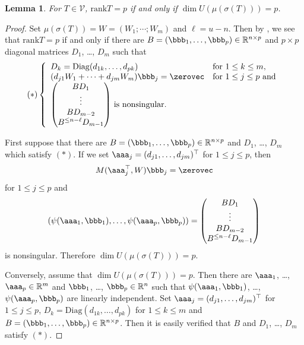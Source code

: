 \documentclass[a4paper,12pt]{article}
\newcommand{\RRR}{\mathbb{R}}
\newcommand{\msVVV}{\mathscr{V}}
\newcommand{\rank}{\mathrm{rank}}
\newcommand{\transpose}{^\top}
\newcommand\diag{\mathrm{Diag}}
\newcommand\nonsing{nonsingular}
\newtheorem{lemma}[thm]{Lemma}
\begin{document}
\begin{lemma}
\label{lem:rank p}
For $T\in\msVVV$, 
$\rank T=p$ if and only if $\dim U(\mu(\sigma(T)))=p$.
\end{lemma}
%
%
\begin{proof}
Set $\mu(\sigma(T))=W=(W_1;\cdots;W_m)$
and $\ell=u-n$.
Then by \cite[Theorem 6.5 (1)$\iff$(3)]{sms17},
we see that $\rank T=p$ if and only if there are
$B=(\bbb_1, \ldots, \bbb_p)\in\RRR^{n\times p}$
and $p\times p$ diagonal matrices $D_1$, \ldots, $D_m$
such that
$$
(\ast)
\left\{
\begin{array}{lll}
D_k=\diag(d_{1k},\ldots, d_{pk})&\mbox{for $1\leq k\leq m$,}\\
(d_{j1}W_1+\cdots+d_{jm}W_m)\bbb_j=\zerovec&\mbox{for $1\leq j\leq p$ and}\\
\mbox{$\begin{pmatrix}
BD_1\\\vdots\\BD_{m-2}\\B^{\leq n-\ell}D_{m-1}\end{pmatrix}$ is \nonsing.}
\end{array}
\right.
$$

First suppose that there are $B=(\bbb_1, \ldots, \bbb_p)\in\RRR^{n\times p}$
and $D_1$, \ldots, $D_m$ which satisfy $(\ast)$.
If we set $\aaa_j=(d_{j1},\ldots, d_{jm})\transpose$ for $1\leq j\leq p$, then
$$
M(\aaa_j\transpose,W)\bbb_j=\zerovec
$$
for $1\leq j\leq p$ and
$$
(\psi(\aaa_1,\bbb_1), \ldots,\psi(\aaa_p,\bbb_p))=
\begin{pmatrix}
BD_1\\\vdots\\BD_{m-2}\\B^{\leq n-\ell}D_{m-1}\end{pmatrix}
$$
is \nonsing.
Therefore $\dim U(\mu(\sigma(T)))=p$.


Conversely, assume that $\dim U(\mu(\sigma(T)))=p$.
Then there are $\aaa_1$, \ldots, $\aaa_p\in\RRR^m$ and
$\bbb_1$, \ldots, $\bbb_p\in\RRR^n$ such that
$\psi(\aaa_1,\bbb_1)$, \ldots, $\psi(\aaa_p,\bbb_p)$ are linearly independent.
Set $\aaa_j=(d_{j1},\ldots,d_{jm})\transpose$ for $1\leq j\leq p$,
$D_k=\diag(d_{1k},\ldots,d_{pk})$ for $1\leq k\leq m$ and 
$B=(\bbb_1,\ldots,\bbb_p)\in\RRR^{n\times p}$.
Then it is easily verified that $B$ and 
$D_1$, \ldots, $D_m$ satisfy $(\ast)$.
\end{proof}



\end{document}
